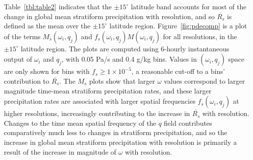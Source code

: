 \documentclass[times]{qjrms4}
\begin{document}
Table~\ref{tbl:table2} indicates that the $\pm 15^{\circ}$ latitude band accounts for most of the change in global mean stratiform precipitation with resolution, and so $\overline{R_s}$ is defined as the mean over the $\pm 15^{\circ}$ latitude region. Figure~\ref{fig:pdecomp} is a plot of the terms $M_s \left( \omega_i , q_j \right)$ and $f_s \left( \omega_i , q_j \right) M\left( \omega_i , q_j \right)$ for all resolutions, in the $\pm 15^{\circ}$ latitude region. The plots are computed using 6-hourly instantaneous output of $\omega_{i}$ and $q_{j}$, with 0.05 Pa/s and 0.4 g/kg bins. Values in  $\left( \omega_{i} , q_{j} \right)$ space are only shown for bins with $f_s \geq1 \times 10^{-5}$, a reasonable cut-off to a bins' contribution to $\overline{R_s}$. The $M_s$ plots show that larger $\omega$ values correspond to larger magnitude time-mean stratiform precipitation rates, and these larger precipitation rates are associated with larger spatial frequencies $f_s \left( \omega_i , q_j \right)$ at higher resolutions, increasingly contributing to the increase in $\overline{R_{s}}$ with resolution. Changes to the time mean spatial frequency of the $q$ field contributes comparatively much less to changes in stratiform precipitation, and so the increase in global mean stratiform precipitation with resolution is primarily a result of the increase in magnitude of $\omega$ with resolution.
\end{document}
